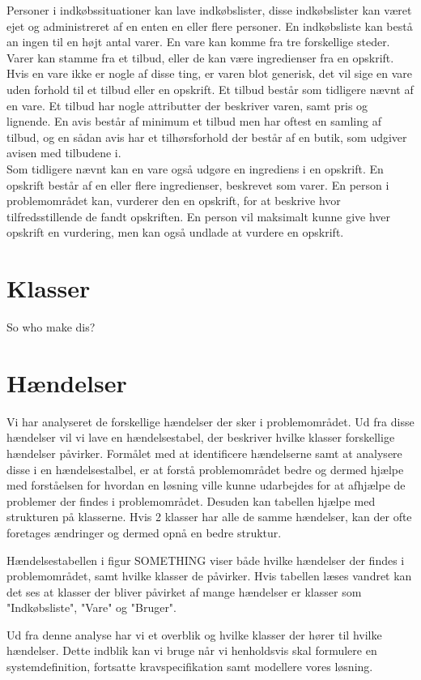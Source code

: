 Personer i indkøbssituationer kan lave indkøbslister, disse indkøbslister kan været ejet og administreret af en enten en eller flere personer. 
En indkøbsliste kan bestå an ingen til en højt antal varer.
En vare kan komme fra tre forskellige steder.
Varer kan stamme fra et tilbud, eller de kan være ingredienser fra en opskrift. 
Hvis en vare ikke er nogle af disse ting, er varen blot generisk, det vil sige en vare uden forhold til et tilbud eller en opskrift.
Et tilbud består som tidligere nævnt af en vare.
Et tilbud har nogle attributter der beskriver varen, samt pris og lignende.
En avis består af minimum et tilbud men har oftest en samling af tilbud, og en sådan avis har et tilhørsforhold der består af en butik, som udgiver avisen med tilbudene i.\\
Som tidligere nævnt kan en vare også udgøre en ingrediens i en opskrift.
En opskrift består af en eller flere ingredienser, beskrevet som varer.
En person i problemområdet kan, vurderer den en opskrift, for at beskrive hvor tilfredsstillende de fandt opskriften.
En person vil maksimalt kunne give hver opskrift en vurdering, men kan også undlade at vurdere en opskrift.

\section{Klasser}
So who make dis?

\section{Hændelser}
Vi har analyseret de forskellige hændelser der sker i problemområdet.  
Ud fra disse hændelser vil vi lave en hændelsestabel, der beskriver hvilke klasser forskellige hændelser påvirker.
Formålet med at identificere hændelserne samt at analysere disse i en hændelsestalbel, er at forstå problemområdet bedre og dermed hjælpe med forståelsen for hvordan en løsning ville kunne udarbejdes for at afhjælpe de problemer der findes i problemområdet. Desuden kan tabellen hjælpe med strukturen på klasserne. 
Hvis 2 klasser har alle de samme hændelser, kan der ofte foretages ændringer og dermed opnå en bedre struktur.



Hændelsestabellen i figur SOMETHING viser både hvilke hændelser der findes i problemområdet, samt hvilke klasser de påvirker.
Hvis tabellen læses vandret kan det ses at klasser der bliver påvirket af mange hændelser er klasser som "Indkøbsliste", "Vare" og "Bruger".


Ud fra denne analyse har vi et overblik og hvilke klasser der hører til hvilke hændelser.
Dette indblik kan vi bruge når vi henholdsvis skal formulere en systemdefinition, fortsatte kravspecifikation samt modellere vores løsning. 